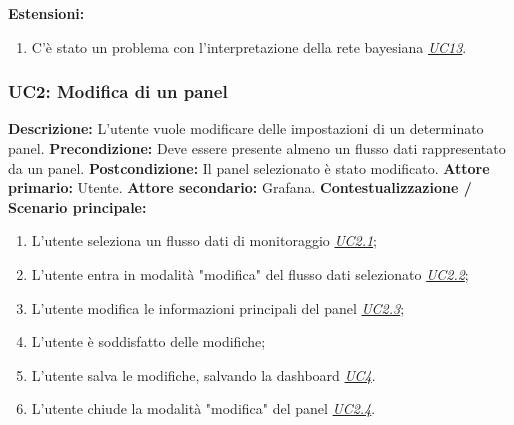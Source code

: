                     \textbf{Estensioni:} \begin{enumerate}
                            \item C’è stato un problema con l’interpretazione della rete bayesiana \underline{\textit{UC13}}.
                        \end{enumerate}
                        
                
                        
                \subsubsection{UC2: Modifica di un panel}
                    \textbf{Descrizione:} L’utente vuole modificare delle impostazioni di un determinato panel.
                    \newline
                    \textbf{Precondizione:} Deve essere presente almeno un flusso dati rappresentato da un panel.
                    \newline
                    \textbf{Postcondizione:} Il panel selezionato è stato modificato.
                    \newline
                    \textbf{Attore primario:} Utente.
                    \newline
                    \textbf{Attore secondario:} Grafana.
                    \newline
                    \textbf{Contestualizzazione / Scenario principale:} \begin{enumerate}
                        \item L’utente seleziona un flusso dati di monitoraggio \underline{\textit{UC2.1}};
                        \item L’utente entra in modalità "modifica" del flusso dati selezionato \underline{\textit{UC2.2}};
                        \item L’utente modifica le informazioni principali del panel \underline{\textit{UC2.3}};
                        \item L’utente è soddisfatto delle modifiche;
                        \item L'utente salva le modifiche, salvando la dashboard \underline{\textit{UC4}}.
                        \item L’utente chiude la modalità "modifica" del panel \underline{\textit{UC2.4}}.
                    \end{enumerate}
                    
